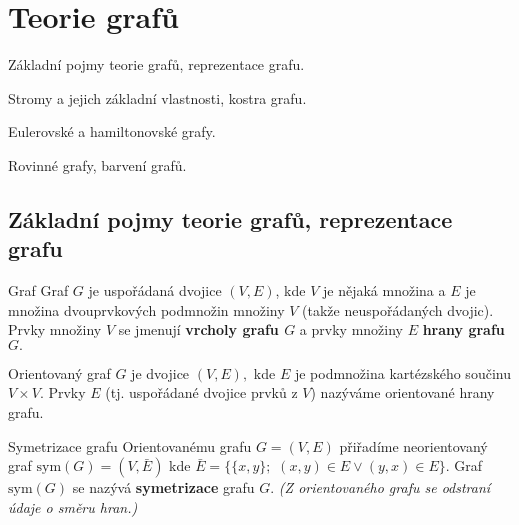 \section{Teorie grafů}

\begin{poziadavky}
\begin{pitemize}
    \item Základní pojmy teorie grafů, reprezentace grafu.
    \item Stromy a jejich základní vlastnosti, kostra grafu.
    \item Eulerovské a hamiltonovské grafy.
    \item Rovinné grafy, barvení grafů.
\end{pitemize}
\end{poziadavky}

\subsection{Základní pojmy teorie grafů, reprezentace grafu}

\begin{definiceN}{Graf}
Graf $G$ je uspořádaná dvojice $(V,E)$, kde $V$ je nějaká množina a $E$ je množina dvouprvkových podmnožin množiny $V$ (takže neuspořádaných dvojic). Prvky množiny $V$ se jmenují \textbf{vrcholy grafu $G$} a prvky množiny $E$ \textbf{hrany grafu $G.$}
\end{definiceN}

\begin{definiceN}{Orientovaný graf}
$G$ je dvojice $(V,E),$ kde $E$ je podmnožina kartézského součinu $V \times V$. Prvky $E$ (tj. uspořádané dvojice prvků z $V$) nazýváme orientované hrany grafu.
\end{definiceN}

\begin{definiceN}{Symetrizace grafu}
Orientovanému grafu $G=(V,E)$ přiřadíme neorientovaný graf $\mathrm{sym}(G) = (V,\bar E) $ kde $\bar E=\{\{x,y\};$ $(x,y) \in E \lor (y,x) \in E \}.$ Graf $\mathrm{sym}(G)$ se nazývá \textbf{symetrizace} grafu $G.$ \textit{(Z orientovaného grafu se odstraní údaje o směru hran.)}
\end{definiceN}

